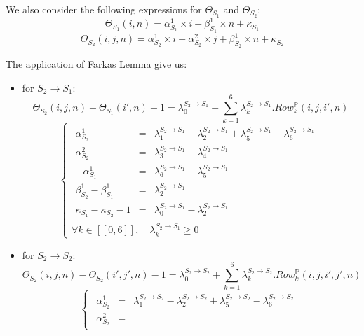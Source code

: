 	We also consider the following expressions for $\Theta_{S_{1}}$ and $\Theta_{S_{2}}$:
$$\Theta_{S_{1}}(i, n) = \alpha_{S_{1}}^{1} \times i + \beta_{S_{1}}^{1} \times n + \kappa_{S_{1}}$$
$$\Theta_{S_{2}}(i, j, n) = \alpha_{S_{2}}^{1} \times i + \alpha_{S_{2}}^{2} \times j + \beta_{S_{2}}^{1} \times n + \kappa_{S_{2}}$$

	The application of Farkas Lemma give us:
\begin{itemize}
	\item for $S_{2} \rightarrow S_{1}$:
	$$ \Theta_{S_{2}}(i, j, n) - \Theta_{S_{1}}(i', n) - 1 =
	\lambda_{0}^{S_{2} \rightarrow S_{1}} + \sum_{k = 1}^{6} \lambda_{k}^{S_{2} \rightarrow S_{1}} . Row_{k}^{\mathbb{P}}(i, j, i', n) $$
	$$ \left\{
	\begin{array}{l}
	\begin{array}{rcl}
			\alpha_{S_{2}}^{1} & = &
				\lambda_{1}^{S_{2} \rightarrow S_{1}}
				- \lambda_{2}^{S_{2} \rightarrow S_{1}}
				+ \lambda_{5}^{S_{2} \rightarrow S_{1}}
				- \lambda_{6}^{S_{2} \rightarrow S_{1}}\\
			\alpha_{S_{2}}^{2} & = &
				\lambda_{3}^{S_{2} \rightarrow S_{1}}
				- \lambda_{4}^{S_{2} \rightarrow S_{1}} \\
			- \alpha_{S_{1}}^{1} & = &
				\lambda_{6}^{S_{2} \rightarrow S_{1}}
				- \lambda_{5}^{S_{2} \rightarrow S_{1}} \\
			\beta_{S_{2}}^{1} - \beta_{S_{1}}^{1} & = &
				\lambda_{2}^{S_{2} \rightarrow S_{1}} \\
			\kappa_{S_{1}} - \kappa_{S_{2}} - 1 & = &
				\lambda_{0}^{S_{2} \rightarrow S_{1}}
				- \lambda_{2}^{S_{2} \rightarrow S_{1}}
		\end{array}\\
		\forall k \in [\![ 0, 6 ]\!], \quad \lambda_{k}^{S_{2} \rightarrow S_{1}} \geq 0
	\end{array}
	\right. $$
	\item for $S_{2} \rightarrow S_{2}$:
	$$ \Theta_{S_{2}}(i, j, n) - \Theta_{S_{2}}(i', j', n) - 1 =
	\lambda_{0}^{S_{2} \rightarrow S_{2}} + \sum_{k = 1}^{6} \lambda_{k}^{S_{2} \rightarrow S_{2}} . Row_{k}^{\mathbb{P}}(i, j, i', j', n) $$
	$$ \left\{
	\begin{array}{l}
		\begin{array}{rcl}
			 \alpha_{S_{2}}^{1} & = &
				\lambda_{1}^{S_{2} \rightarrow S_{2}}
				- \lambda_{2}^{S_{2} \rightarrow S_{2}}
				+ \lambda_{5}^{S_{2} \rightarrow S_{2}}
				- \lambda_{6}^{S_{2} \rightarrow S_{2}} \\
			\alpha_{S_{2}}^{2} & = &

\end{array}
\end{array}$$
\end{itemize}
